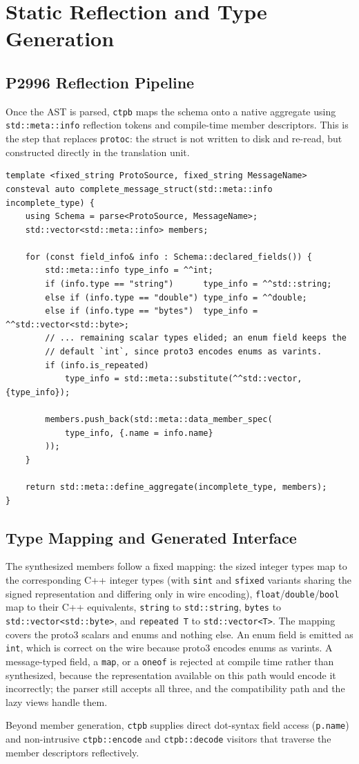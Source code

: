 \section{Static Reflection and Type Generation}
\label{sec:reflection}

\subsection{P2996 Reflection Pipeline}
Once the AST is parsed, \texttt{ctpb} maps the schema onto a native aggregate using \texttt{std::meta::info} reflection tokens and compile-time member descriptors. This is the step that replaces \texttt{protoc}: the struct is not written to disk and re-read, but constructed directly in the translation unit.

\begin{lstlisting}[language=ModernC++, caption={Programmatic Struct Member Injection}]
template <fixed_string ProtoSource, fixed_string MessageName>
consteval auto complete_message_struct(std::meta::info incomplete_type) {
    using Schema = parse<ProtoSource, MessageName>;
    std::vector<std::meta::info> members;

    for (const field_info& info : Schema::declared_fields()) {
        std::meta::info type_info = ^^int;
        if (info.type == "string")      type_info = ^^std::string;
        else if (info.type == "double") type_info = ^^double;
        else if (info.type == "bytes")  type_info = ^^std::vector<std::byte>;
        // ... remaining scalar types elided; an enum field keeps the
        // default `int`, since proto3 encodes enums as varints.
        if (info.is_repeated)
            type_info = std::meta::substitute(^^std::vector, {type_info});

        members.push_back(std::meta::data_member_spec(
            type_info, {.name = info.name}
        ));
    }

    return std::meta::define_aggregate(incomplete_type, members);
}
\end{lstlisting}

\subsection{Type Mapping and Generated Interface}
The synthesized members follow a fixed mapping: the sized integer types map to the corresponding C++ integer types (with \texttt{sint} and \texttt{sfixed} variants sharing the signed representation and differing only in wire encoding), \texttt{float}/\texttt{double}/\texttt{bool} map to their C++ equivalents, \texttt{string} to \texttt{std::string}, \texttt{bytes} to \texttt{std::vector<std::byte>}, and \texttt{repeated T} to \texttt{std::vector<T>}. The mapping covers the proto3 scalars and enums and nothing else. An enum field is emitted as \texttt{int}, which is correct on the wire because proto3 encodes enums as varints. A message-typed field, a \texttt{map}, or a \texttt{oneof} is rejected at compile time rather than synthesized, because the representation available on this path would encode it incorrectly; the parser still accepts all three, and the compatibility path and the lazy views handle them.

Beyond member generation, \texttt{ctpb} supplies direct dot-syntax field access (\texttt{p.name}) and non-intrusive \texttt{ctpb::encode} and \texttt{ctpb::decode} visitors that traverse the member descriptors reflectively.

